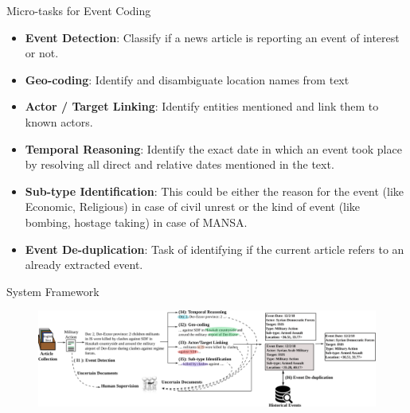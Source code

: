 \begin{frame}{Micro-tasks for Event Coding}
    \begin{itemize}
    \item \textbf{Event Detection}: Classify if a news article is reporting an event of interest or not.
    \item \textbf{Geo-coding}: Identify and disambiguate location names from text
    \item \textbf{Actor / Target Linking}: Identify entities mentioned and link them to known actors. 
    \item \textbf{Temporal Reasoning}: Identify the exact date in which an event took place by resolving all direct and relative dates mentioned in the text.
    \item \textbf{Sub-type Identification}: This could be either the reason for the event (like Economic, Religious) in case of civil unrest or the kind of event (like bombing, hostage taking) in case of MANSA.
    \item \textbf{Event De-duplication}: Task of identifying if the current article refers to an already extracted event.
\end{itemize}
\end{frame}


\begin{frame}{System Framework}
    \begin{figure}
        \centering
        \includegraphics[width=\textwidth]{Problem2/figures/eventCoding_framework.pdf}
        \label{fig:my_label}
    \end{figure}
\end{frame}

